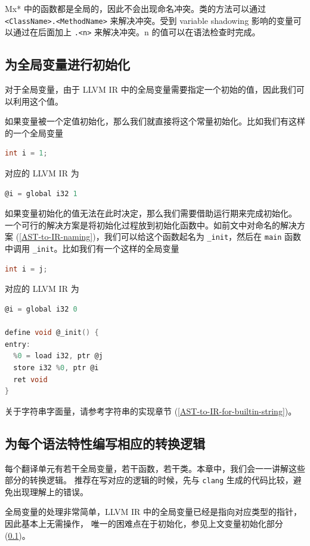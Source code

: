 Mx* 中的函数都是全局的，因此不会出现命名冲突。类的方法可以通过
\texttt{<ClassName>.<MethodName>} 来解决冲突。受到 variable shadowing
影响的变量可以通过在后面加上 \texttt{.<n>} 来解决冲突。n 的值可以在语法检查时完成。

\subsection{为全局变量进行初始化}\label{AST-to-IR-initializing}

对于全局变量，由于 LLVM IR 中的全局变量需要指定一个初始的值，因此我们可以利用这个值。

如果变量被一个定值初始化，那么我们就直接将这个常量初始化。比如我们有这样的一个全局变量
\begin{lstlisting}[language=C]
int i = 1;
\end{lstlisting}
对应的 LLVM IR 为
\begin{lstlisting}[language=C]
@i = global i32 1
\end{lstlisting}

如果变量初始化的值无法在此时决定，那么我们需要借助运行期来完成初始化。
一个可行的解决方案是将初始化过程放到初始化函数中。如前文中对命名的解决方案
(\ref{AST-to-IR-naming})，我们可以给这个函数起名为 \texttt{\_init}，然后在
\texttt{main} 函数中调用 \texttt{\_init}。比如我们有一个这样的全局变量
\begin{lstlisting}[language=C]
int i = j;
\end{lstlisting}
对应的 LLVM IR 为
\begin{lstlisting}[language=C]
@i = global i32 0

define void @_init() {
entry:
  %0 = load i32, ptr @j
  store i32 %0, ptr @i
  ret void
}
\end{lstlisting}

关于字符串字面量，请参考字符串的实现章节 (\ref{AST-to-IR-for-builtin-string})。

\subsection{为每个语法特性编写相应的转换逻辑}\label{AST-to-IR-specific-grammar}

每个翻译单元有若干全局变量，若干函数，若干类。本章中，我们会一一讲解这些部分的转换逻辑。
推荐在写对应的逻辑的时候，先与 \texttt{clang} 生成的代码比较，避免出现理解上的错误。

全局变量的处理非常简单，LLVM IR 中的全局变量已经是指向对应类型的指针，因此基本上无需操作，
唯一的困难点在于初始化，参见上文变量初始化部分 (\ref{AST-to-IR-initializing})。


